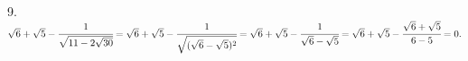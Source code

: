 9. $\sqrt{6}+\sqrt{5}-\cfrac{1}{\sqrt{11-2\sqrt{30}}}=\sqrt{6}+\sqrt{5}-\cfrac{1}{\sqrt{(\sqrt{6}-\sqrt{5})^2}}=
\sqrt{6}+\sqrt{5}-\cfrac{1}{\sqrt{6}-\sqrt{5}}=\sqrt{6}+\sqrt{5}-\cfrac{\sqrt{6}+\sqrt{5}}{6-5}=0.$\\
